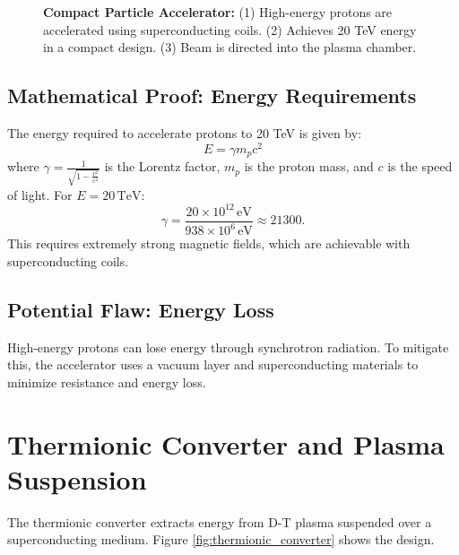 \documentclass[12pt, a4paper]{article}
\begin{document}
\begin{figure}[H]
\centering
{}
\caption{
\textbf{Compact Particle Accelerator:} 
(1) High-energy protons are accelerated using superconducting coils. 
(2) Achieves 20 TeV energy in a compact design. 
(3) Beam is directed into the plasma chamber.
}
\label{fig:compact_accelerator}
\end{figure}

\subsection{Mathematical Proof: Energy Requirements}
The energy required to accelerate protons to 20 TeV is given by:
\[
E = \gamma m_p c^2
\]
where \( \gamma = \frac{1}{\sqrt{1 - \frac{v^2}{c^2}}} \) is the Lorentz factor, \( m_p \) is the proton mass, and \( c \) is the speed of light. For \( E = 20 \, \text{TeV} \):
\[
\gamma = \frac{20 \times 10^{12} \, \text{eV}}{938 \times 10^6 \, \text{eV}} \approx 21300.
\]
This requires extremely strong magnetic fields, which are achievable with superconducting coils.

\subsection{Potential Flaw: Energy Loss}
High-energy protons can lose energy through synchrotron radiation. To mitigate this, the accelerator uses a vacuum layer and superconducting materials to minimize resistance and energy loss.

\section{Thermionic Converter and Plasma Suspension}
The thermionic converter extracts energy from D-T plasma suspended over a superconducting medium. Figure \ref{fig:thermionic_converter} shows the design.
\end{document}
